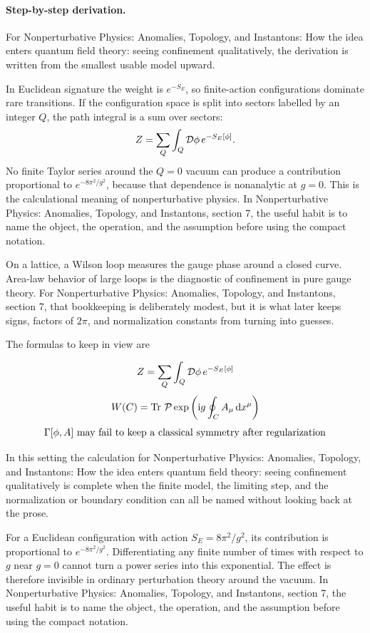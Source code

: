 \paragraph{Step-by-step derivation.}

For Nonperturbative Physics: Anomalies, Topology, and Instantons: How the idea enters quantum field theory: seeing confinement qualitatively, the derivation is written from the smallest usable model upward.

In Euclidean signature the weight is \(e^{-S_E}\), so finite-action configurations dominate rare transitions.  If the configuration space is split into sectors labelled by an integer \(Q\), the path integral is a sum over sectors:
\[
  Z=\sum_Q\int_Q\mathcal D\phi\,e^{-S_E[\phi]}.
\]
No finite Taylor series around the \(Q=0\) vacuum can produce a contribution proportional to \(e^{-8\pi^2/g^2}\), because that dependence is nonanalytic at \(g=0\).  This is the calculational meaning of nonperturbative physics.  In Nonperturbative Physics: Anomalies, Topology, and Instantons, section 7, the useful habit is to name the object, the operation, and the assumption before using the compact notation.

On a lattice, a Wilson loop measures the gauge phase around a closed curve.  Area-law behavior of large loops is the diagnostic of confinement in pure gauge theory.  For Nonperturbative Physics: Anomalies, Topology, and Instantons, section 7, that bookkeeping is deliberately modest, but it is what later keeps signs, factors of \(2\pi\), and normalization constants from turning into guesses.

The formulas to keep in view are

\[
  Z=\sum_Q\int_Q\mathcal D\phi\,e^{-S_E[\phi]}
\]
\[
  W(C)=\operatorname{Tr}\,\mathcal P\exp\left(\mathrm i g\oint_C A_\mu\,\mathrm d x^\mu\right)
\]
\[
  \Gamma[\phi,A]\hbox{ may fail to keep a classical symmetry after regularization}
\]

In this setting the calculation for Nonperturbative Physics: Anomalies, Topology, and Instantons: How the idea enters quantum field theory: seeing confinement qualitatively is complete when the finite model, the limiting step, and the normalization or boundary condition can all be named without looking back at the prose.




\begin{example}
For a Euclidean configuration with action \(S_E=8\pi^2/g^2\), its contribution is proportional to \(e^{-8\pi^2/g^2}\).  Differentiating any finite number of times with respect to \(g\) near \(g=0\) cannot turn a power series into this exponential.  The effect is therefore invisible in ordinary perturbation theory around the vacuum.  In Nonperturbative Physics: Anomalies, Topology, and Instantons, section 7, the useful habit is to name the object, the operation, and the assumption before using the compact notation.
\end{example}



